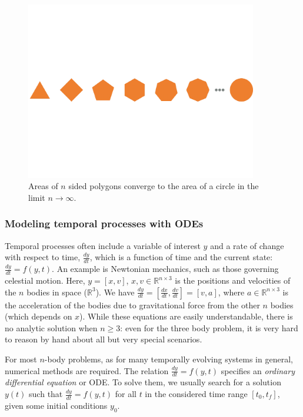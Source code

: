 \documentclass{puthesis}
\begin{document}
\begin{figure}[t]
  \centering
\includegraphics[width=0.9\textwidth]{intro_figures/polygon_cropped.pdf}
\caption{\small Areas of $n$ sided polygons converge to the area of a circle
in the limit $n \to \infty$.}%
\label{Fig:polygon}%
\end{figure}


\subsubsection{Modeling temporal processes with ODEs}
Temporal processes often include a variable of interest $y$ and a
rate of change with respect to time, $\frac{dy}{dt}$, which is a
function of time and the current state: $\frac{dy}{dt} = f(y, t)$.
An example is Newtonian mechanics, such as those governing celestial motion.
Here, $y = [x, v]$, $x, v \in \mathbb{R}^{n \times 3}$ is the
positions and velocities of the $n$ bodies in space ($\mathbb{R}^3$).
We have $\frac{dy}{dt} = [\frac{dx}{dt}, \frac{dv}{dt}] = [v, a]$, where
$a \in \mathbb{R}^{n \times 3}$ is the acceleration of the bodies due to
gravitational force from the other $n$ bodies (which depends on $x$).
While these equations are easily understandable, there is no analytic
solution when $n \geq 3$: even for the three body problem, it is very
hard to reason by hand about all but very special scenarios.

For most $n$-body problems, as for many temporally evolving systems in general, numerical methods are required.
The relation $\frac{dy}{dt} = f(y, t)$ specifies an \emph{ordinary differential equation} or ODE.
To solve them, we usually search for a solution $y(t)$ such that
$\frac{dy}{dt} = f(y, t)$ for all $t$ in the considered time range
$[t_0, t_f]$, given some initial conditions $y_0$.
\end{document}
